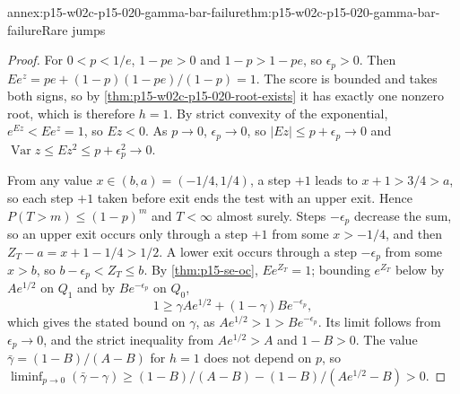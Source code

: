 \begin{annexitem}{annex:p15-w02c-p15-020-gamma-bar-failure}{thm:p15-w02c-p15-020-gamma-bar-failure}{Rare jumps}
\begin{proof}
For \(0<p<1/e\), \(1-pe>0\) and \(1-p>1-pe\), so \(\epsilon_p>0\). Then
\(Ee^z=pe+(1-p)(1-pe)/(1-p)=1\). The score is bounded and takes both
signs, so by \cref{thm:p15-w02c-p15-020-root-exists} it has exactly one
nonzero root, which is therefore \(h=1\). By strict convexity of the
exponential, \(e^{Ez}<Ee^z=1\), so \(Ez<0\). As \(p\to0\),
\(\epsilon_p\to0\), so \(|Ez|\leq p+\epsilon_p\to0\) and
\(\operatorname{Var}z\leq Ez^2\leq p+\epsilon_p^2\to0\).

From any value \(x\in(b,a)=(-1/4,1/4)\), a step \(+1\) leads to
\(x+1>3/4>a\), so each step \(+1\) taken before exit ends the test with
an upper exit. Hence \(P(T>m)\leq(1-p)^m\) and \(T<\infty\) almost
surely. Steps \(-\epsilon_p\) decrease the sum, so an upper exit occurs
only through a step \(+1\) from some \(x>-1/4\), and then
\(Z_T-a=x+1-1/4>1/2\). A lower exit occurs through a step
\(-\epsilon_p\) from some \(x>b\), so \(b-\epsilon_p<Z_T\leq b\). By
\cref{thm:p15-se-oc}, \(Ee^{Z_T}=1\); bounding \(e^{Z_T}\) below by
\(Ae^{1/2}\) on \(Q_1\) and by \(Be^{-\epsilon_p}\) on \(Q_0\),
\[
 1\geq\gamma Ae^{1/2}+(1-\gamma)Be^{-\epsilon_p},
\]
which gives the stated bound on \(\gamma\), as \(Ae^{1/2}>1>Be^{-\epsilon_p}\).
Its limit follows from \(\epsilon_p\to0\), and the strict inequality
from \(Ae^{1/2}>A\) and \(1-B>0\). The value
\(\bar\gamma=(1-B)/(A-B)\) for \(h=1\) does not depend on \(p\), so
\(\liminf_{p\to0}(\bar\gamma-\gamma)\geq(1-B)/(A-B)-(1-B)/(Ae^{1/2}-B)>0\).
\end{proof}
\end{annexitem}

